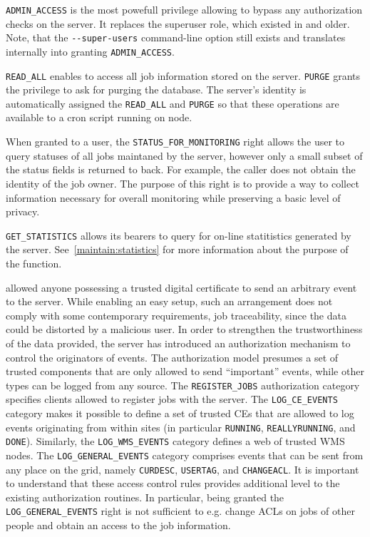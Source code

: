 \verb'ADMIN_ACCESS' is the most powefull privilege allowing to bypass any
authorization checks on the server. It replaces the superuser role, which
existed in  and older. Note, that the \verb'--super-users'
command-line option still exists and translates internally into granting
\verb'ADMIN_ACCESS'.

\verb'READ_ALL' enables to access all job information stored on the server.
\verb'PURGE' grants the privilege to ask for purging the \LB database.  The \LB
server's identity is automatically assigned the \verb'READ_ALL' and
\verb'PURGE' so that these operations are available \eg to a cron script
running on \LB node.

When granted to a user, the \verb'STATUS_FOR_MONITORING' right allows the user to
query statuses of all jobs maintaned by the server, however only a small
subset of the status fields is returned to back. For example, the caller
does not obtain the identity of the job owner. The purpose of this right is
to provide a way to collect information necessary for overall monitoring
while preserving a basic level of privacy.

\verb'GET_STATISTICS' allows its bearers to query for on-line statitistics
generated by the \LB server. See~\ref{maintain:statistics} for more
information about the purpose of the function.

 allowed anyone possessing a trusted digital certificate to send an
arbitrary event to the \LB server. While enabling an easy setup, such an
arrangement does not comply with some contemporary requirements, \eg job
traceability, since the data could be distorted by a malicious user.  In order
to strengthen the trustworthiness of the data provided, the 
server has introduced an authorization mechanism to control the originators
of events.  The authorization model presumes a set of trusted components
that are only allowed to send ``important'' events, while other types can be
logged from any source. The \verb'REGISTER_JOBS' authorization category
specifies clients allowed to register jobs with the \LB server. The
\verb'LOG_CE_EVENTS' category makes it possible to define a set of trusted
CEs that are allowed to log events originating from within sites (in
particular \verb'RUNNING', \verb'REALLYRUNNING', and \verb'DONE').
Similarly, the \verb'LOG_WMS_EVENTS' category defines a web of trusted WMS
nodes. The \verb'LOG_GENERAL_EVENTS' category comprises events that can be
sent from any place on the grid, namely \verb'CURDESC', \verb'USERTAG', and
\verb'CHANGEACL'. It is important to understand that these access control
rules provides additional level to the existing authorization routines.
In particular, being granted the \verb'LOG_GENERAL_EVENTS' right is not sufficient to
e.g. change ACLs on jobs of other people and obtain an access to the job information.

